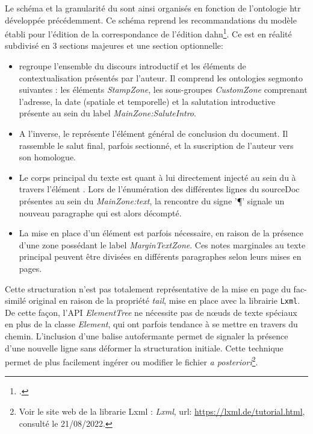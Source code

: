 	Le schéma et la granularité du  sont ainsi organisés en fonction de l'ontologie \gls{htr} développée précédemment. Ce schéma reprend les recommandations du modèle établi pour l'édition de la correspondance de l'édition \gls{dahn}\footcite{chiffoleauDAHNProjectDigital2022}. Ce  est en réalité subdivisé en 3 sections majeures et une section optionnelle:
	\begin{itemize}
	    \item {} regroupe l'ensemble du discours introductif et les éléments de contextualisation présentés par l'auteur. Il comprend les ontologies \gls{segmonto} suivantes : les éléments \textit{StampZone}, les sous-groupes \textit{CustomZone} comprenant l'adresse, la date (spatiale et temporelle) et la salutation introductive présente au sein du label \textit{MainZone:SaluteIntro}.
	    \item A l'inverse, le  représente l'élément général de conclusion du document. Il rassemble le salut final, parfois sectionné, et la suscription de l'auteur vers son homologue.
	    \item Le corps principal du texte est quant à lui directement injecté au sein du  à travers l'élément . Lors de l'énumération des différentes lignes du sourceDoc présentes au sein du \textit{MainZone:text}, la rencontre du signe '\P' signale un nouveau paragraphe qui est alors décompté.
	    \item La mise en place d'un élément  est parfois nécessaire, en raison de la présence d'une zone possédant le label \textit{MarginTextZone}. Ces notes marginales au texte principal peuvent être divisées en différents paragraphes selon leurs mises en pages. \newline
	\end{itemize}
	
	Cette structuration n'est pas totalement représentative de la mise en page du fac-similé original en raison de la propriété \textit{tail}, mise en place avec la librairie \texttt{Lxml}.  De cette façon, l'\gls{API} \textit{ElementTree} ne nécessite pas de nœuds de texte spéciaux en plus de la classe \textit{Element}, qui ont  parfois tendance à se mettre en travers du chemin. L'inclusion d'une balise autofermante  permet de signaler la présence d'une nouvelle ligne sans déformer la structuration initiale. Cette technique permet de plus facilement ingérer ou modifier le fichier \textit{a posteriori}\footnote{Voir le site web de la librarie Lxml : \textit{Lxml}, url: \url{https://lxml.de/tutorial.html}, consulté le 21/08/2022.}.
	
